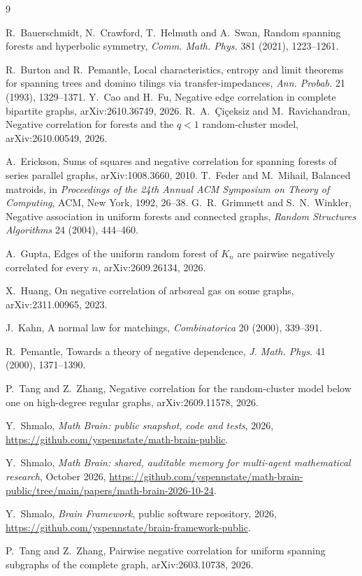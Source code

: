 \documentclass[11pt]{amsart}
\theoremstyle{remark}
\begin{document}
\begin{thebibliography}{9}

R.~Bauerschmidt, N.~Crawford, T.~Helmuth and A.~Swan, Random spanning forests and
hyperbolic symmetry, \emph{Comm. Math. Phys.} 381 (2021), 1223--1261.

R.~Burton and R.~Pemantle, Local characteristics, entropy and limit theorems for
spanning trees and domino tilings via transfer-impedances, \emph{Ann. Probab.} 21
(1993), 1329--1371.
Y.~Cao and H.~Fu, Negative edge correlation in complete bipartite graphs,
arXiv:2610.36749, 2026.
R.~A.~\c{C}i\c{c}eksiz and M.~Ravichandran, Negative correlation for forests and the
$q<1$ random-cluster model, arXiv:2610.00549, 2026.

A.~Erickson, Sums of squares and negative correlation for spanning forests of series
parallel graphs, arXiv:1008.3660, 2010.
T.~Feder and M.~Mihail, Balanced matroids, in \emph{Proceedings of the 24th Annual ACM
Symposium on Theory of Computing}, ACM, New York, 1992, 26--38.
G.~R.~Grimmett and S.~N.~Winkler, Negative association in uniform forests and connected
graphs, \emph{Random Structures Algorithms} 24 (2004), 444--460.

A.~Gupta, Edges of the uniform random forest of $K_n$ are pairwise negatively
correlated for every $n$, arXiv:2609.26134, 2026.

X.~Huang, On negative correlation of arboreal gas on some graphs, arXiv:2311.00965, 2023.

J.~Kahn, A normal law for matchings, \emph{Combinatorica} 20 (2000), 339--391.

R.~Pemantle, Towards a theory of negative dependence, \emph{J. Math. Phys.} 41 (2000),
1371--1390.

P.~Tang and Z.~Zhang, Negative correlation for the random-cluster model below one on
high-degree regular graphs, arXiv:2609.11578, 2026.

 Y.~Shmalo, \emph{Math Brain: public snapshot, code and tests}, 2026, \url{https://github.com/yspennstate/math-brain-public}.

 Y.~Shmalo, \emph{Math Brain: shared, auditable memory for multi-agent mathematical research}, October 2026, \url{https://github.com/yspennstate/math-brain-public/tree/main/papers/math-brain-2026-10-24}.

 Y.~Shmalo, \emph{Brain Framework}, public software repository, 2026, \url{https://github.com/yspennstate/brain-framework-public}.

P.~Tang and Z.~Zhang, Pairwise negative correlation for uniform spanning subgraphs of
the complete graph, arXiv:2603.10738, 2026.
\end{thebibliography}
\end{document}
